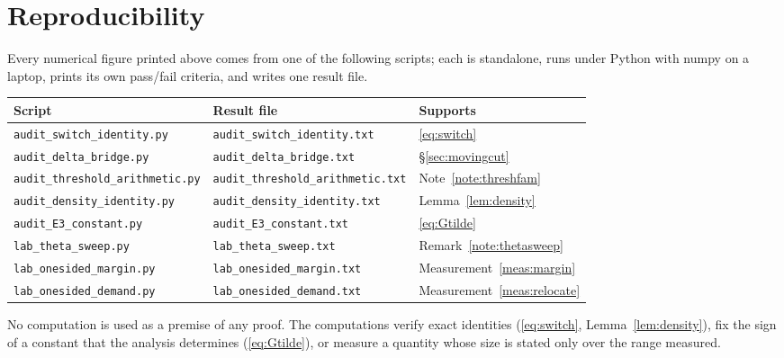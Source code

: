 \documentclass[11pt,a4paper]{article}
\theoremstyle{plain}
\theoremstyle{definition}
\theoremstyle{remark}
\begin{document}
\appendix
\section{Reproducibility}

Every numerical figure printed above comes from one of the following
scripts; each is standalone, runs under Python with numpy on a laptop,
prints its own pass/fail criteria, and writes one result file.

\begin{center}
\begin{tabular}{lll}
\hline
Script & Result file & Supports\\
\hline
\texttt{audit\_switch\_identity.py} &
 \texttt{audit\_switch\_identity.txt} & \eqref{eq:switch}\\
\texttt{audit\_delta\_bridge.py} &
 \texttt{audit\_delta\_bridge.txt} & \S\ref{sec:movingcut}\\
\texttt{audit\_threshold\_arithmetic.py} &
 \texttt{audit\_threshold\_arithmetic.txt} & Note~\ref{note:threshfam}\\
\texttt{audit\_density\_identity.py} &
 \texttt{audit\_density\_identity.txt} & Lemma~\ref{lem:density}\\
\texttt{audit\_E3\_constant.py} &
 \texttt{audit\_E3\_constant.txt} & \eqref{eq:Gtilde}\\
\texttt{lab\_theta\_sweep.py} &
 \texttt{lab\_theta\_sweep.txt} & Remark~\ref{note:thetasweep}\\
\texttt{lab\_onesided\_margin.py} &
 \texttt{lab\_onesided\_margin.txt} & Measurement~\ref{meas:margin}\\
\texttt{lab\_onesided\_demand.py} &
 \texttt{lab\_onesided\_demand.txt} & Measurement~\ref{meas:relocate}\\
\hline
\end{tabular}
\end{center}

No computation is used as a premise of any proof. The computations
verify exact identities (\eqref{eq:switch}, Lemma~\ref{lem:density}),
fix the sign of a constant that the analysis determines
(\eqref{eq:Gtilde}), or measure a quantity whose size is stated only
over the range measured.
\end{document}
